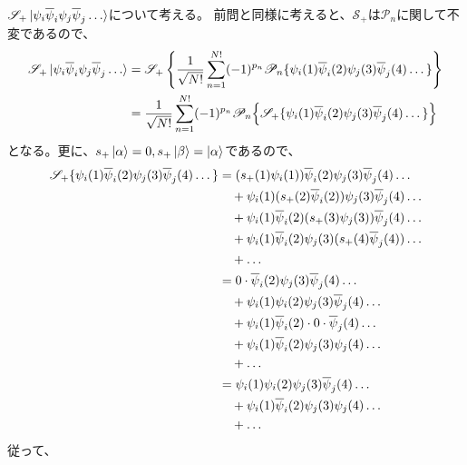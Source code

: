 $\mathscr{S}_+ \ket{{\psi}_i{\overline{\psi}}_i{\psi}_j{\overline{\psi}}_j\dots}$について考える。
前問と同様に考えると、$\mathscr{S}_+$は$\mathscr{P}_n$に関して不変であるので、
\begin{align}
	\mathscr{S}_+ \ket{\aorb{\psi}_i\borb{\psi}_i\aorb{\psi}_j\borb{\psi}_j\dots}
&=
	\mathscr{S}_+\left\{
		\frac{1}{\sqrt{N!}}
		\sum_{n=1}^{N!}
			(-1)^{p_n}
			\mathscr{P}_n\{
				\aorb{\psi}_i(1) \borb{\psi}_i(2) \aorb{\psi}_j(3) \borb{\psi}_j(4) \dots
			\}
	\right\} \\
%
%
&=
	\frac{1}{\sqrt{N!}}
	\sum_{n=1}^{N!}
		(-1)^{p_n}
		\mathscr{P}_n\Bigl\{
				\mathscr{S}_+\{
					\aorb{\psi}_i(1) \borb{\psi}_i(2) \aorb{\psi}_j(3) \borb{\psi}_j(4) \dots
				\}
		\Bigr\}
\end{align}
となる。更に、$s_+\ket{\alpha}=0, s_+\ket{\beta}=\ket{\alpha}$であるので、
\begin{align}
	\mathscr{S}_+\{
		\aorb{\psi}_i(1) \borb{\psi}_i(2) \aorb{\psi}_j(3) \borb{\psi}_j(4) \dots
	\}
&=
	(s_+(1) \aorb{\psi}_i(1)) \borb{\psi}_i(2) \aorb{\psi}_j(3) \borb{\psi}_j(4) \dots \nonumber \\ &\quad
	+
	\aorb{\psi}_i(1) (s_+(2) \borb{\psi}_i(2)) \aorb{\psi}_j(3) \borb{\psi}_j(4) \dots \nonumber \\ &\quad
	+
	\aorb{\psi}_i(1) \borb{\psi}_i(2) (s_+(3) \aorb{\psi}_j(3)) \borb{\psi}_j(4) \dots \nonumber \\ &\quad
	+
	\aorb{\psi}_i(1) \borb{\psi}_i(2) \aorb{\psi}_j(3) (s_+(4) \borb{\psi}_j(4)) \dots \nonumber \\ &\quad
	+
	\dots \\
%
%
&=
	0 \cdot \borb{\psi}_i(2) \aorb{\psi}_j(3) \borb{\psi}_j(4) \dots \nonumber \\ &\quad
	+
	\aorb{\psi}_i(1) \aorb{\psi}_i(2) \aorb{\psi}_j(3) \borb{\psi}_j(4) \dots \nonumber \\ &\quad
	+
	\aorb{\psi}_i(1) \borb{\psi}_i(2) \cdot 0 \cdot \borb{\psi}_j(4) \dots \nonumber \\ &\quad
	+
	\aorb{\psi}_i(1) \borb{\psi}_i(2) \aorb{\psi}_j(3) \aorb{\psi}_j(4) \dots \nonumber \\ &\quad
	+
	\dots \\
%
%
&=
	\aorb{\psi}_i(1) \aorb{\psi}_i(2) \aorb{\psi}_j(3) \borb{\psi}_j(4) \dots \nonumber \\ &\quad
	+
	\aorb{\psi}_i(1) \borb{\psi}_i(2) \aorb{\psi}_j(3) \aorb{\psi}_j(4) \dots \nonumber \\ &\quad
	+
	\dots
\end{align}
従って、
